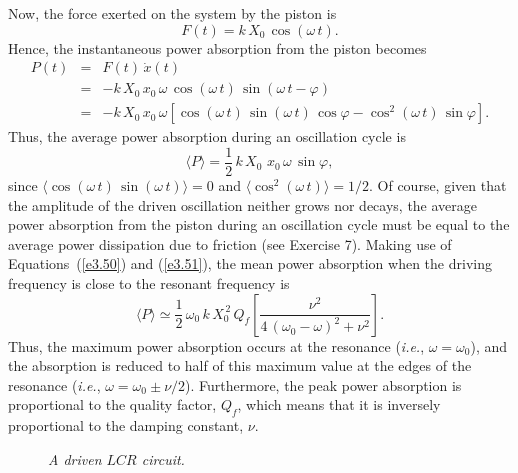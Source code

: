 Now, the force exerted on the system by the piston is
\begin{equation}
F(t) = k\,X_0\,\cos(\omega\,t).
\end{equation}
Hence, the instantaneous power absorption from the piston becomes
\begin{eqnarray}
P(t) &=& F(t)\,\dot{x}(t)\nonumber\\[0.5ex]
&=& - k\,X_0\,x_0\,\omega\,\cos(\omega\,t)\,\sin(\omega\,t-\varphi)\nonumber\\[0.5ex]
&=& -k\,X_0\,x_0\,\omega\left[\cos(\omega\,t)\,\sin(\omega\,t)\,\cos\varphi - \cos^2(\omega\,t)\,\sin\varphi\right].
\end{eqnarray}
Thus, the average power absorption during an oscillation cycle is
\begin{equation}
\langle P\rangle = \frac{1}{2}\,k\,X_0\,\,x_0\,\omega\,\sin\varphi,
\end{equation}
since $\langle \cos(\omega\,t)\,\sin(\omega\,t)\rangle =0$ and $\langle \cos^2(\omega\,t)\rangle =1/2$. Of course, given that the amplitude of the driven oscillation neither grows nor decays, the average power absorption from the piston during an oscillation cycle must be equal to the average power dissipation  due to friction (see Exercise 7). 
Making use of Equations~(\ref{e3.50}) and (\ref{e3.51}), the mean power absorption when the driving
frequency is close to the resonant frequency is
\begin{equation}\label{e3.56}
\langle P\rangle \simeq \frac{1}{2}\,\omega_0\,k\,X_0^{\,2}\,Q_f\left[\frac{\nu^2}{4\,(\omega_0-\omega)^2+\nu^2}\right].
\end{equation}
Thus, the maximum power absorption occurs at the resonance ({\em i.e.}, $\omega=\omega_0$), and the absorption is reduced to half of this maximum value at the edges of the
resonance ({\em i.e.}, $\omega=\omega_0\pm \nu/2$). Furthermore, the peak power
absorption is proportional to the quality factor,  $Q_f$, which means that it is inversely
proportional to the damping constant, $\nu$. 

\begin{figure}
\centerline{}
\caption{\em A driven $LCR$ circuit.}\label{f3.5}   
\end{figure}

